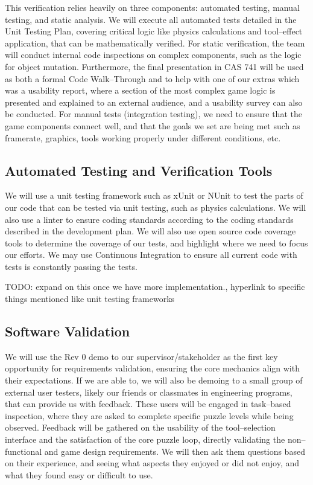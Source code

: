 \documentclass[12pt, titlepage]{article}
\begin{document}
This verification relies heavily on three components: automated testing, manual testing, and static analysis. We will execute all automated tests detailed in the Unit Testing Plan, covering critical logic like physics calculations and tool--effect application, that can be mathematically verified. For static verification, the team will conduct internal code inspections on complex components, such as the logic for object mutation. Furthermore, the final presentation in CAS 741 will be used as both a formal Code Walk--Through and to help with one of our extras which was a usability report, where a section of the most complex game logic is presented and explained to an external audience, and a usability survey can also be conducted. For manual tests (integration testing), we need to ensure that the game components connect well, and that the goals we set are being met such as framerate, graphics, tools working properly under different conditions, etc.

\subsection{Automated Testing and Verification Tools}

We will use a unit testing framework such as xUnit or NUnit to test the parts of our code that can be tested via unit testing, such as physics calculations. We will also use a linter to ensure coding standards according to the coding standards described in the development plan. We will also use open source code coverage tools to determine the coverage of our tests, and highlight where we need to focus our efforts. We may use Continuous Integration to ensure all current code with tests is constantly passing the tests.

TODO: expand on this once we have more implementation., hyperlink to specific things mentioned like unit testing frameworks

\subsection{Software Validation}

We will use the Rev 0 demo to our supervisor/stakeholder as the first key opportunity for requirements validation, ensuring the core mechanics align with their expectations. If we are able to, we will also be demoing to a small group of external user testers, likely our friends or classmates in engineering programs, that can provide us with feedback. These users will be engaged in task--based inspection, where they are asked to complete specific puzzle levels while being observed. Feedback will be gathered on the usability of the tool--selection interface and the satisfaction of the core puzzle loop, directly validating the non--functional and game design requirements. We will then ask them questions based on their experience, and seeing what aspects they enjoyed or did not enjoy, and what they found easy or difficult to use.
\end{document}

